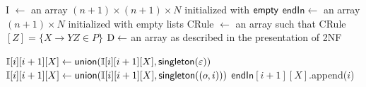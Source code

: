 \begin{algorithm}[t]
	\caption{Preprocessing phase: given a 2NF
        unambiguous annotated grammar $\cG = (N, \Sigma, \Omega, P, S)$ and
        a non-empty string $w = a_1\cdots a_n$, compute an enumerable set
        representing $\sem{\cA}(w)$.}\label{alg:preprocessing}
        \label{alg:cubic}
		\begin{algorithmic}[1]
                  \State I $\gets$ an array $(n+1)\times (n+1)\times N$ initialized with $\mathsf{empty}$
                  \State  $\mathsf{endIn}\gets$ an array $(n+1)\times N$
                  initialized with empty lists
                  \State CRule $\gets$ an array such that CRule$[Z]=\{X\rightarrow YZ \in P \}$
                  \State $\mathrm{D} \gets $ an array as described in the presentation of 2NF

                   \label{ln:initstart} 
                      \State $\mathbb{I}[i][i+1][X] \gets \mathsf{union}(\mathbb{I}[i][i+1][X], \textsf{singleton}(\varepsilon))$
                    \EndIf
                      \State $\tableI[i][i+1][X] \gets \union(\tableI[i][i+1][X], \singleton((\oout, i)))$
                    \EndFor
                    \If{$\tableI[i][i+1][X] \neq \empt$}
                      \State $\mathsf{endIn}[i+1][X]$.append($i$)
                      \label{ln:endset1}
                    \EndIf
                  \EndFor \label{ln:initend} 




\end{algorithmic}
\end{algorithm}

